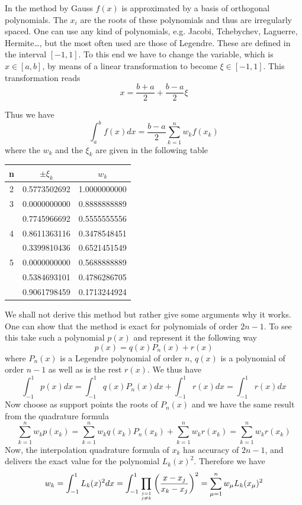 In the method by Gauss $f(x)$ is approximated by a basis of orthogonal
polynomials. The $x_i$ are the roots of these polynomials and thus are
irregularly spaced. One can use any kind of polynomials, e.g. Jacobi,
Tchebychev, Laguerre, Hermite\dots, but the most often used are those of
Legendre. These are defined in the interval $[-1,1]$. To this end we have to
change the variable, which is $x\in[a,b]$, by means of a linear transformation
to become $\xi\in[-1,1]$. This transformation reads
\[x=\frac{b+a}{2}+\frac{b-a}{2}\xi \]

Thus we have
\[\int_a^bf(x)dx=\frac{b-a}{2}\sum_{k=1}^{n}w_kf(x_k)\]
where the $w_k$ and the $\xi_k$ are given in the following table
\begin{center}
\begin{tabular}{|c|c|c|}
\hline
n&$\pm\xi_k$&$w_k$\\\hline
2&0.5773502692&1.0000000000\\\hline
3&0.0000000000&0.8888888889\\
 &0.7745966692&0.5555555556\\\hline
4&0.8611363116&0.3478548451\\
 &0.3399810436&0.6521451549\\\hline
5&0.0000000000&0.5688888889\\
 &0.5384693101&0.4786286705\\
 &0.9061798459&0.1713244924\\\hline
\end{tabular}
\end{center}

We shall not derive this method but rather give some arguments why it works.
One can show that the method is exact for polynomials of order $2n-1$. To see
this take such a polynomial $p(x)$ and represent it the following way
\[ p(x)=q(x)P_n(x) +r(x)\]
where $P_n(x)$ is a Legendre polynomial of order $n$, $q(x)$ is a polynomial of
order $n-1$ as well as is the rest $r(x)$. 
We thus have
\[ \int_{-1}^1p(x)dx=\int_{-1}^1q(x) P_n(x) dx+\int_{-1}^1r(x)dx=\int_{-1}^1r(x)dx\]
Now choose as support points the roots of $P_n(x)$ and we have the same result
from the quadrature formula
\[ \sum_{k=1}^nw_kp(x_k)=\sum_{k=1}^nw_kq(x_k)P_n(x_k)
+\sum_{k=1}^nw_kr(x_k)=\sum_{k=1}^nw_kr(x_k)\]
Now, the interpolation quadrature
formula of $x_k$ has accuracy of $2n-1$, and delivers the exact value for the
polynomial $L_k(x)^2$. Therefore we have
\[ w_k=\int_{-1}^1L_k(x)^2dx=\int_{-1}^1\prod_{j=1\atop j\neq
k}\left(\frac{x-x_j}{x_k-x_j}\right)^2=\sum_{\mu=1}^nw_\mu L_k(x_\mu)^2\]

